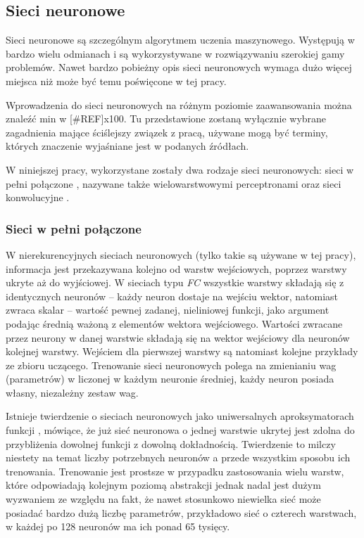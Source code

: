 \subsection{Sieci neuronowe}
\label{subsec:nn}

Sieci neuronowe  są szczególnym algorytmem uczenia maszynowego. Występują w bardzo wielu odmianach i są wykorzystywane w rozwiązywaniu szerokiej gamy problemów. Nawet bardzo pobieżny opis sieci neuronowych wymaga dużo więcej miejsca niż może być temu poświęcone w tej pracy. 

Wprowadzenia do sieci neuronowych na różnym poziomie zaawansowania można znaleźć min w [\#REF]x100. 
Tu przedstawione zostaną wyłącznie wybrane zagadnienia mające ściślejszy związek z pracą, używane mogą być terminy, których znaczenie wyjaśniane jest w podanych źródłach.

W niniejszej pracy, wykorzystane zostały dwa rodzaje sieci neuronowych: sieci w pełni połączone , nazywane także wielowarstwowymi perceptronami  oraz sieci konwolucyjne . 

\subsubsection*{Sieci w pełni połączone}
W nierekurencyjnych sieciach neuronowych (tylko takie są używane w tej pracy), informacja jest przekazywana kolejno od warstw wejściowych, poprzez warstwy ukryte aż do wyjściowej. 
W sieciach typu \textit{FC} wszystkie warstwy składają się z identycznych neuronów -- każdy neuron dostaje na wejściu wektor, natomiast zwraca skalar -- wartość pewnej zadanej, nieliniowej funkcji, jako argument podając średnią ważoną z elementów wektora wejściowego. Wartości zwracane przez neurony w danej warstwie składają się na wektor wejściowy dla neuronów kolejnej warstwy. Wejściem dla pierwszej warstwy są natomiast kolejne przykłady ze zbioru uczącego. Trenowanie sieci neuronowych polega na zmienianiu wag (parametrów) w liczonej w każdym neuronie średniej, każdy neuron posiada własny, niezależny zestaw wag.

Istnieje twierdzenie o sieciach neuronowych jako uniwersalnych aproksymatorach funkcji  \cite{hornik91}, mówiące, że już sieć neuronowa o jednej warstwie ukrytej jest zdolna do przybliżenia dowolnej funkcji z dowolną dokładnością. Twierdzenie to milczy niestety na temat liczby potrzebnych neuronów a przede wszystkim sposobu ich trenowania. 
Trenowanie jest prostsze w przypadku zastosowania wielu warstw, które odpowiadają kolejnym poziomą abstrakcji jednak nadal jest dużym wyzwaniem ze względu na fakt, że nawet stosunkowo niewielka sieć może posiadać bardzo dużą liczbę parametrów, przykładowo sieć o czterech warstwach, w każdej po 128 neuronów ma ich ponad 65 tysięcy.


